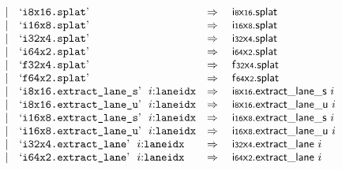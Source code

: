 $$\begin{array}[t]{@{}lrrl@{}l@{}l@{}l@{}}
& & | & \mbox{‘\texttt{i8x16.splat}’} & \quad\Rightarrow\quad{} & {\mathsf{i{\scriptstyle 8}}}{\mathsf{x}}{\mathsf{{\scriptstyle 16}}}{.}\mathsf{splat} \\
& & | & \mbox{‘\texttt{i16x8.splat}’} & \quad\Rightarrow\quad{} & {\mathsf{i{\scriptstyle 16}}}{\mathsf{x}}{\mathsf{{\scriptstyle 8}}}{.}\mathsf{splat} \\
& & | & \mbox{‘\texttt{i32x4.splat}’} & \quad\Rightarrow\quad{} & {\mathsf{i{\scriptstyle 32}}}{\mathsf{x}}{\mathsf{{\scriptstyle 4}}}{.}\mathsf{splat} \\
& & | & \mbox{‘\texttt{i64x2.splat}’} & \quad\Rightarrow\quad{} & {\mathsf{i{\scriptstyle 64}}}{\mathsf{x}}{\mathsf{{\scriptstyle 2}}}{.}\mathsf{splat} \\
& & | & \mbox{‘\texttt{f32x4.splat}’} & \quad\Rightarrow\quad{} & {\mathsf{f{\scriptstyle 32}}}{\mathsf{x}}{\mathsf{{\scriptstyle 4}}}{.}\mathsf{splat} \\
& & | & \mbox{‘\texttt{f64x2.splat}’} & \quad\Rightarrow\quad{} & {\mathsf{f{\scriptstyle 64}}}{\mathsf{x}}{\mathsf{{\scriptstyle 2}}}{.}\mathsf{splat} \\
& & | & \mbox{‘\texttt{i8x16.extract\_lane\_s}’}~~i{:}{\mathtt{laneidx}} & \quad\Rightarrow\quad{} & {{\mathsf{i{\scriptstyle 8}}}{\mathsf{x}}{\mathsf{{\scriptstyle 16}}}{.}\mathsf{extract\_lane}}{\mathsf{\_}}{\mathsf{s}}~i \\
& & | & \mbox{‘\texttt{i8x16.extract\_lane\_u}’}~~i{:}{\mathtt{laneidx}} & \quad\Rightarrow\quad{} & {{\mathsf{i{\scriptstyle 8}}}{\mathsf{x}}{\mathsf{{\scriptstyle 16}}}{.}\mathsf{extract\_lane}}{\mathsf{\_}}{\mathsf{u}}~i \\
& & | & \mbox{‘\texttt{i16x8.extract\_lane\_s}’}~~i{:}{\mathtt{laneidx}} & \quad\Rightarrow\quad{} & {{\mathsf{i{\scriptstyle 16}}}{\mathsf{x}}{\mathsf{{\scriptstyle 8}}}{.}\mathsf{extract\_lane}}{\mathsf{\_}}{\mathsf{s}}~i \\
& & | & \mbox{‘\texttt{i16x8.extract\_lane\_u}’}~~i{:}{\mathtt{laneidx}} & \quad\Rightarrow\quad{} & {{\mathsf{i{\scriptstyle 16}}}{\mathsf{x}}{\mathsf{{\scriptstyle 8}}}{.}\mathsf{extract\_lane}}{\mathsf{\_}}{\mathsf{u}}~i \\
& & | & \mbox{‘\texttt{i32x4.extract\_lane}’}~~i{:}{\mathtt{laneidx}} & \quad\Rightarrow\quad{} & {\mathsf{i{\scriptstyle 32}}}{\mathsf{x}}{\mathsf{{\scriptstyle 4}}}{.}\mathsf{extract\_lane}~i \\
& & | & \mbox{‘\texttt{i64x2.extract\_lane}’}~~i{:}{\mathtt{laneidx}} & \quad\Rightarrow\quad{} & {\mathsf{i{\scriptstyle 64}}}{\mathsf{x}}{\mathsf{{\scriptstyle 2}}}{.}\mathsf{extract\_lane}~i \\

\end{array}$$
